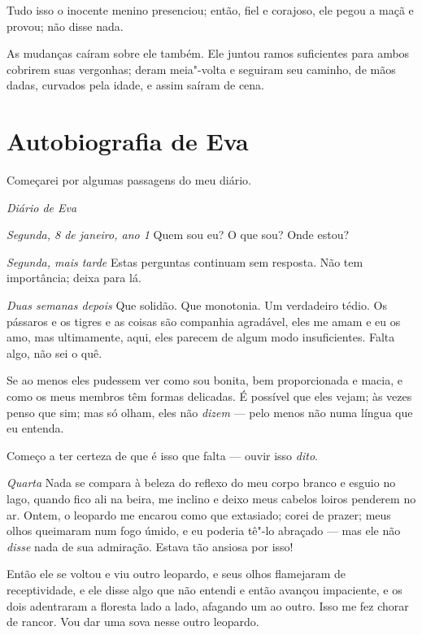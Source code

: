 Tudo isso o inocente menino presenciou; então, fiel e corajoso, ele
pegou a maçã e provou; não disse nada.

As mudanças caíram sobre ele também. Ele juntou ramos suficientes
para ambos cobrirem suas vergonhas; deram meia"-volta e seguiram seu
caminho, de mãos dadas, curvados pela idade, e assim saíram de cena.


\chapter{Autobiografia de Eva}

\sectionitem

\begin{center}
Começarei por algumas passagens do meu diário.
\end{center}

\begin{center}
\textit{Diário de Eva}
\end{center}


\textit{Segunda, 8 de janeiro, ano 1} Quem sou eu? O que sou? Onde estou?

\textit{Segunda, mais tarde} Estas perguntas continuam sem resposta. Não tem importância; deixa para lá.

\textit{Duas semanas depois} Que solidão. Que monotonia. Um verdadeiro tédio. Os pássaros e os tigres
e as coisas são companhia agradável, eles me amam e eu os amo, mas ultimamente, aqui, eles parecem
de algum modo insuficientes. Falta algo, não sei o quê.

Se ao menos eles pudessem ver como sou bonita, bem proporcionada e macia, e como os
meus membros têm formas delicadas. É possível que eles vejam; às vezes penso que sim; mas só
olham, eles não \textit{dizem} --- pelo menos não numa língua que eu entenda.

Começo a ter certeza de que é isso que falta --- ouvir isso \textit{dito}.

\textit{Quarta} Nada se compara à beleza do reflexo do meu corpo branco e esguio no lago,
quando fico ali na beira, me inclino e deixo meus cabelos loiros penderem no ar.
Ontem, o leopardo me encarou como que extasiado; corei de prazer;
meus olhos queimaram num fogo úmido, e eu poderia tê"-lo abraçado --- mas ele não \textit{disse}
nada de sua admiração. Estava tão ansiosa por isso!

Então ele se voltou e viu outro leopardo, e seus olhos flamejaram de receptividade, e ele
disse algo que não entendi e então avançou impaciente, e os dois adentraram a floresta
lado a lado, afagando um ao outro. Isso me fez chorar de rancor.
Vou dar uma sova nesse outro leopardo.

